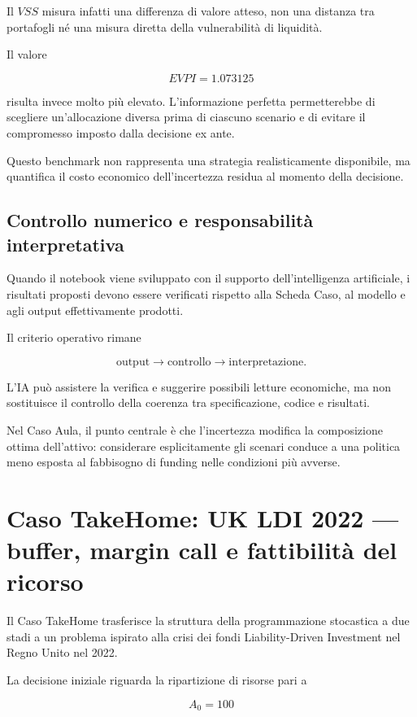 Il \(VSS\) misura infatti una differenza di valore atteso, non una distanza
tra portafogli n\'e una misura diretta della vulnerabilit\`a di liquidit\`a.

Il valore

\[
EVPI=1.073125
\]

\noindent risulta invece molto pi\`u elevato. L'informazione perfetta
permetterebbe di scegliere un'allocazione diversa prima di ciascuno scenario e
di evitare il compromesso imposto dalla decisione ex ante.

Questo benchmark non rappresenta una strategia realisticamente disponibile,
ma quantifica il costo economico dell'incertezza residua al momento della
decisione.


\subsection{Controllo numerico e responsabilit\`a interpretativa}

Quando il notebook viene sviluppato con il supporto dell'intelligenza
artificiale, i risultati proposti devono essere verificati rispetto alla
Scheda Caso, al modello e agli output effettivamente prodotti.

Il criterio operativo rimane

\[
\text{output}
\longrightarrow
\text{controllo}
\longrightarrow
\text{interpretazione}.
\]

L'IA pu\`o assistere la verifica e suggerire possibili letture economiche, ma
non sostituisce il controllo della coerenza tra specificazione, codice e
risultati.

Nel Caso Aula, il punto centrale \`e che l'incertezza modifica la composizione
ottima dell'attivo: considerare esplicitamente gli scenari conduce a una
politica meno esposta al fabbisogno di funding nelle condizioni pi\`u
avverse.


\section{Caso TakeHome: UK LDI 2022 --- buffer, margin call e fattibilit\`a del ricorso}

Il Caso TakeHome trasferisce la struttura della programmazione stocastica a
due stadi a un problema ispirato alla crisi dei fondi Liability-Driven
Investment nel Regno Unito nel 2022.

La decisione iniziale riguarda la ripartizione di risorse pari a

\[
A_0=100
\]

